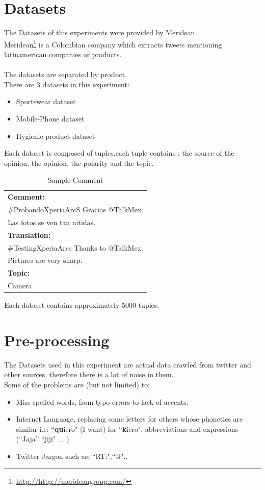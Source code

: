 \documentclass[4pt,a4paper,twocolumn]{article}
\begin{document}
\section{Datasets}
The Datasets of this experiments were provided by Meridean.\\
Meridean\footnote{\url{http://http://merideangroup.com/}} is a Colombian company which extracts tweets
mentioning latinamerican companies or products.\\
\\
The datasets are separated by product.\\
There are 3 datasets in this experiment:
\begin{itemize}
	\item Sportswear dataset
	\item Mobile-Phone dataset
	\item Hygienic-product dataset
\end{itemize}

Each dataset is composed of tuples,each tuple contains : the source of the opinion, the opinion, the polarity and the topic.\\

\begin{table}[h]
\centering
\begin{tabular}{| l |}
\hline
\textbf{Comment:}\\
$\#$ProbandoXperiaArcS Gracias @TalkMex.\\
Las fotos se ven tan nitidas.\\
\hline
\textbf{Translation:}\\
$\#$TestingXperiaArcs Thanks to @TalkMex.\\
Pictures are very sharp.\\
\hline
\textbf{Topic:}\\
Camera\\
\hline
\end{tabular}
\caption{Sample Comment}
\label{tab:sampleTuple}
\end{table}

Each dataset contains approximately 5000 tuples.

\section{Pre-processing}

The Datasets used in this experiment are actual data crawled from twitter and other sources, therefore there is a lot of noise in them.\\
Some of the problems are (but not limited) to:\\
\begin{itemize}
	\item Miss spelled words, from typo errors to lack of accents.
	\item Internet Language, replacing some letters for others whose phonetics are similar i.e: ``\textbf{qu}iero" (I want) for ``\textbf{k}iero", abbreviations and expressions (``Jaja'' ``jiji" ... )
	\item Twitter Jargon such as: ``RT:",``@"..
\end{itemize} 
\end{document}
